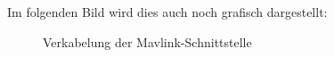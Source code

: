\documentclass[12pt]{article} %
\begin{document}
	Im folgenden Bild wird dies auch noch grafisch dargestellt:
	
	\begin{figure}[H]
		\centering
		\hfill
		\caption{Verkabelung der Mavlink-Schnittstelle}
		\label{2}
	\end{figure}
	
\end{document}

